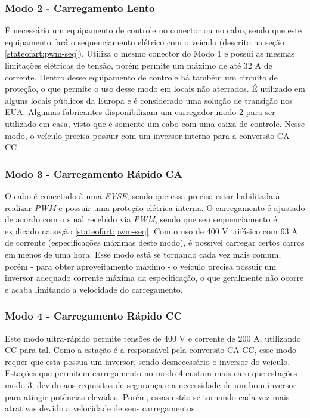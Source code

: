         \subsubsection{Modo 2 - Carregamento Lento}
        \label{stateofart:modes:europe:mode2}

        É necessário um equipamento de controle no conector ou no cabo, sendo que este equipamento fará o sequenciamento elétrico com o veículo (descrito na seção \ref{stateofart:pwm-seq}). Utiliza o mesmo conector do Modo 1 e possui as mesmas limitações elétricas de tensão, porém permite um máximo de até 32 A de corrente. Dentro desse equipamento de controle há também um circuito de proteção, o que permite o uso desse modo em locais não aterrados. É utilizado em alguns locais públicos da Europa e é considerado uma solução de transição nos EUA. Algumas fabricantes disponibilizam um carregador modo 2 para ser utilizado em casa, visto que é somente um cabo com uma caixa de controle. Nesse modo, o veículo precisa possuir com um inversor interno para a conversão \ac{CA}-\ac{CC}.

        \subsubsection{Modo 3 - Carregamento Rápido CA}
        \label{stateofart:modes:europe:mode3}

        O cabo é conectado à uma \textit{\ac{EVSE}}, sendo que essa precisa estar habilitada à realizar \textit{\ac{PWM}} e possuir uma proteção elétrica interna. O carregamento é ajustado de acordo com o sinal recebido via \textit{\ac{PWM}}, sendo que seu sequenciamento é explicado na seção \ref{stateofart:pwm-seq}. Com o uso de 400 V trifásico com 63 A de corrente (especificações máximas deste modo), é possível carregar certos carros em menos de uma hora. Esse modo está se tornando cada vez mais comum, porém - para obter aproveitamento máximo - o veículo precisa possuir um inversor adequado corrente máxima da especificação, o que geralmente não ocorre e acaba limitando a velocidade do carregamento.

        \subsubsection{Modo 4 - Carregamento Rápido CC}
        \label{stateofart:modes:europe:mode4}

        Este modo ultra-rápido permite tensões de 400 V e corrente de 200 A, utilizando \ac{CC} para tal. Como a estação é a responsável pela conversão \ac{CA}-\ac{CC}, esse modo requer que esta possua um inversor, sendo desnecessário o inversor do veículo. Estações que permitem carregamento no modo 4 custam mais caro que estações modo 3, devido aos requisitos de segurança e a necessidade de um bom inversor para atingir potências elevadas. Porém, essas estão se tornando cada vez mais atrativas devido a velocidade de seus carregamentos.


